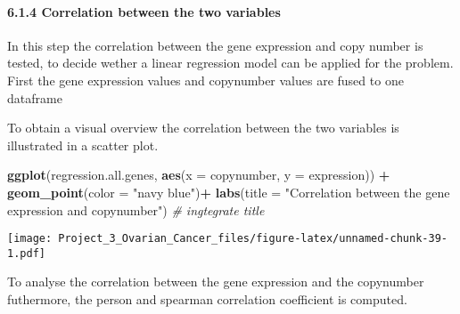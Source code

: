 \documentclass[]{article}
\newenvironment{Shaded}{\begin{snugshade}}{\end{snugshade}}
\newcommand{\CommentTok}[1]{\textcolor[rgb]{0.56,0.35,0.01}{\textit{#1}}}
\newcommand{\DataTypeTok}[1]{\textcolor[rgb]{0.13,0.29,0.53}{#1}}
\newcommand{\KeywordTok}[1]{\textcolor[rgb]{0.13,0.29,0.53}{\textbf{#1}}}
\newcommand{\NormalTok}[1]{#1}
\newcommand{\OperatorTok}[1]{\textcolor[rgb]{0.81,0.36,0.00}{\textbf{#1}}}
\newcommand{\StringTok}[1]{\textcolor[rgb]{0.31,0.60,0.02}{#1}}
\let\oldparagraph\paragraph
\renewcommand{\paragraph}[1]{\oldparagraph{#1}\mbox{}}
\begin{document}
\hypertarget{correlation-between-the-two-variables}{%
\paragraph{6.1.4 Correlation between the two
variables}\label{correlation-between-the-two-variables}}

In this step the correlation between the gene expression and copy number
is tested, to decide wether a linear regression model can be applied for
the problem. First the gene expression values and copynumber values are
fused to one dataframe

\begin{Shaded}
\end{Shaded}

To obtain a visual overview the correlation between the two variables is
illustrated in a scatter plot.

\begin{Shaded}
\begin{Highlighting}[]
\KeywordTok{ggplot}\NormalTok{(regression.all.genes, }\KeywordTok{aes}\NormalTok{(}\DataTypeTok{x =}\NormalTok{ copynumber, }\DataTypeTok{y =}\NormalTok{ expression)) }\OperatorTok{+}\StringTok{ }\KeywordTok{geom_point}\NormalTok{(}\DataTypeTok{color =} \StringTok{"navy blue"}\NormalTok{)}\OperatorTok{+}\StringTok{ }\KeywordTok{labs}\NormalTok{(}\DataTypeTok{title =} \StringTok{"Correlation between the gene expression and copynumber"}\NormalTok{) }\CommentTok{# ingtegrate title}
\end{Highlighting}
\end{Shaded}

\texttt{[image: Project\_3\_Ovarian\_Cancer\_files/figure-latex/unnamed-chunk-39-1.pdf]}

To analyse the correlation between the gene expression and the
copynumber futhermore, the person and spearman correlation coefficient
is computed.

\begin{Shaded}
\end{Shaded}
\end{document}
